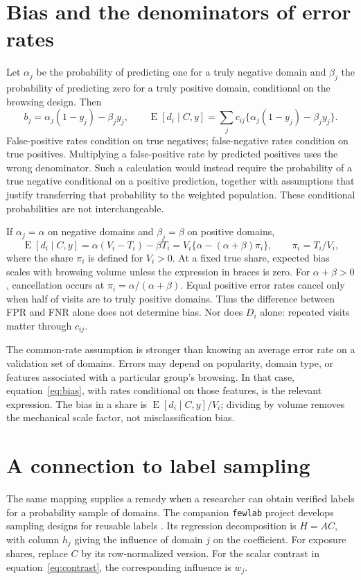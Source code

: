 \documentclass[11pt,letterpaper]{article}
\newcommand{\E}{\operatorname{E}}
\begin{document}
\appendix
\section{Bias and the denominators of error rates}\label{app:rates}
Let $\alpha_j$ be the probability of predicting one for a truly negative domain
and $\beta_j$ the probability of predicting zero for a truly positive domain,
conditional on the browsing design. Then
\begin{equation}\label{eq:bias}
 b_j=\alpha_j(1-y_j)-\beta_j y_j,\qquad
 \E[d_i\mid C,y]=\sum_j c_{ij}\{\alpha_j(1-y_j)-\beta_j y_j\}.
\end{equation}
False-positive rates condition on true negatives; false-negative rates condition
on true positives. Multiplying a false-positive rate by predicted positives
uses the wrong denominator. Such a calculation would instead require the
probability of a true negative conditional on a positive prediction, together
with assumptions that justify transferring that probability to the weighted
population. These conditional probabilities are not interchangeable.

If $\alpha_j=\alpha$ on negative domains and $\beta_j=\beta$ on positive domains,
\begin{equation}\label{eq:constantbias}
 \E[d_i\mid C,y]=\alpha(V_i-T_i)-\beta T_i
 =V_i\{\alpha-(\alpha+\beta)\pi_i\},\qquad \pi_i=T_i/V_i,
\end{equation}
where the share $\pi_i$ is defined for $V_i>0$. At a fixed true share, expected
bias scales with browsing volume unless the expression in braces is zero.
For $\alpha+\beta>0$, cancellation occurs at
$\pi_i=\alpha/(\alpha+\beta)$. Equal positive error rates cancel only when
half of visits are to truly positive domains. Thus the difference between
FPR and FNR alone does not determine bias. Nor does $D_i$ alone: repeated
visits matter through $c_{ij}$.

The common-rate assumption is stronger than knowing an average error rate on a
validation set of domains. Errors may depend on popularity, domain type, or
features associated with a particular group's browsing. In that case,
equation~\eqref{eq:bias}, with rates conditional on those features, is the
relevant expression. The bias in a share is $\E[d_i\mid C,y]/V_i$; dividing
by volume removes the mechanical scale factor, not misclassification bias.


\section{A connection to label sampling}
The same mapping supplies a remedy when a researcher can obtain verified
labels for a probability sample of domains. The companion \texttt{fewlab}
project develops sampling designs for reusable labels \citep{sood2026fewlab}.
Its regression decomposition is $H=AC$, with column $h_j$ giving the influence
of domain $j$ on the coefficient. For exposure shares, replace $C$ by its
row-normalized version. For the scalar contrast in equation~\eqref{eq:contrast},
the corresponding influence is $w_j$.
\end{document}
